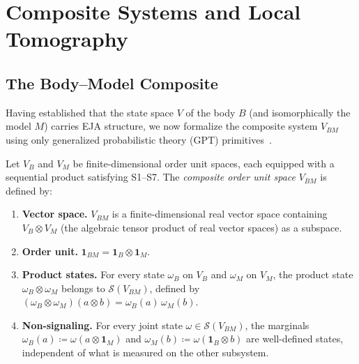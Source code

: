 
\section{Composite Systems and Local Tomography}\label{sec:composite}

\subsection{The Body--Model Composite}\label{subsec:composite-def}

Having established that the state space $V$ of the body $B$ (and
isomorphically the model $M$) carries EJA structure, we now formalize the
composite system $V_{BM}$ using only generalized probabilistic theory
(GPT) primitives~\cite{Plavala2023,Barnum2023}.

\begin{definition}\label{def:composite}
Let $V_B$ and $V_M$ be finite-dimensional order unit spaces, each
equipped with a sequential product satisfying S1--S7. The
\emph{composite order unit space} $V_{BM}$ is defined by:
\begin{enumerate}
\item[\emph{(C1)}] \textbf{Vector space.}
  $V_{BM}$ is a finite-dimensional real vector space containing
  $V_B \otimes V_M$ (the algebraic tensor product of real vector
  spaces) as a subspace.
\item[\emph{(C2)}] \textbf{Order unit.}
  $\mathbf{1}_{BM} = \mathbf{1}_B \otimes \mathbf{1}_M$.
\item[\emph{(C3)}] \textbf{Product states.}
  For every state $\omega_B$ on $V_B$ and $\omega_M$ on $V_M$, the
  product state $\omega_B \otimes \omega_M$ belongs to $\mathcal{S}(V_{BM})$,
  defined by $(\omega_B\otimes\omega_M)(a\otimes b)
  = \omega_B(a)\,\omega_M(b)$.
\item[\emph{(C4)}] \textbf{Non-signaling.}
  For every joint state $\omega \in \mathcal{S}(V_{BM})$, the marginals
  $\omega_B(a) \coloneqq \omega(a\otimes\mathbf{1}_M)$ and
  $\omega_M(b) \coloneqq \omega(\mathbf{1}_B\otimes b)$ are well-defined
  states, independent of what is measured on the other subsystem.
\end{enumerate}
\end{definition}


